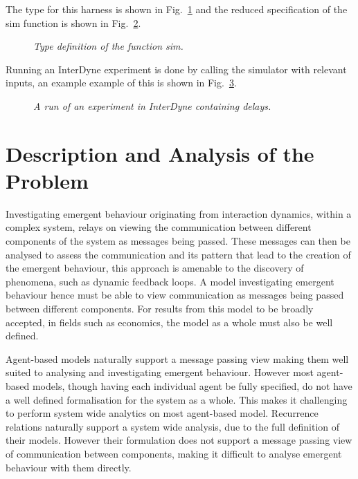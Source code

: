 \documentclass{article}
\begin{document}
The type for this harness is shown in Fig.~\ref{fig:harntypintfirst} and the reduced specification of the sim function is shown in Fig.~\ref{fig:intersimfun}.

\begin{figure}[H]
	\centering
        
	\caption{\it Type definition of the function sim.}
	\label{fig:harntypintfirst}
\end{figure} 

\begin{figure}[H]
	\centering
        
	\caption{\it }
	\label{fig:intersimfun}
\end{figure} 




Running an InterDyne experiment is done by calling the simulator with relevant inputs, an example example of this is shown in Fig.~\ref{fig:runninginterdyne}.
\begin{figure}[H]
	\centering
        
	\caption{\it A run of an experiment in InterDyne containing delays.}
	\label{fig:runninginterdyne}
\end{figure} 









\section {Description and Analysis of the Problem} \label{despriptionandanalysproblem}

Investigating emergent behaviour originating from interaction dynamics, within a complex system, relays on viewing the communication between different components of the system as messages being passed. These messages can then be analysed to assess the communication and its pattern that lead to the creation of the emergent behaviour, this approach is amenable to the discovery of phenomena, such as dynamic feedback loops. A model investigating emergent behaviour hence must be able to view communication as messages being passed between different components. For results from this model to be broadly accepted, in fields such as economics, the model as a whole must also be well defined.      

Agent-based models naturally support a message passing view making them well suited to analysing and investigating emergent behaviour. However most agent-based models, though having each individual agent be fully specified, do not have a well defined formalisation for the system as a whole. This makes it challenging to perform system wide analytics on most agent-based model. Recurrence relations naturally support a system wide analysis, due to the full definition of their models. However their formulation does not support a message passing view of communication between components, making it difficult to analyse emergent behaviour with them directly. 
\end{document}
